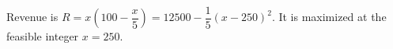 Revenue is $ R=x(100-\dfrac{x}{5})=12500-\dfrac{1}{5}(x-250)^2 $. It is maximized at the feasible integer $\boxed{x=250}$.
